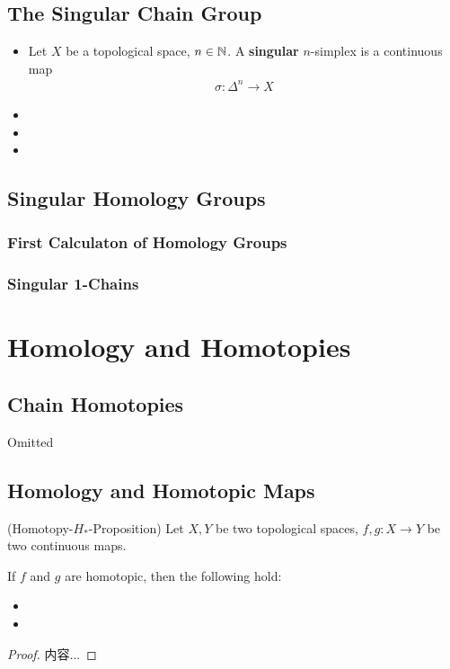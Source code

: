 \documentclass[Total.tex]{subfiles}
\begin{document}
				\subsection{The Singular Chain Group}
				\begin{Def}
					\begin{itemize}
						\item Let $X$ be a topological space, $n\in \mathbb{N}$. A \textbf{singular} $n$-simplex is a continuous map
						\begin{gather*}
							\sigma:\Delta^n\rightarrow X
						\end{gather*}
						\item 
						\item 
						\item 
					\end{itemize}
				\end{Def}
				\subsection{Singular Homology Groups}	
					\subsubsection{First Calculaton of Homology Groups}
					\subsubsection{Singular 1-Chains}
		\section{Homology and Homotopies}
			\subsection{Chain Homotopies}
				Omitted
			\subsection{Homology and Homotopic Maps}
				\begin{proposition}
					(Homotopy-$H_*$-Proposition) Let $X,Y$ be two topological spaces, $f,g:X\rightarrow Y$ be two continuous maps.
					
					If $f$ and $g$ are homotopic, then the following hold:
					\begin{itemize}
						\item 
						\item 
					\end{itemize}
				\end{proposition}
				\begin{proof}
					内容...
				\end{proof}
				
\end{document}
